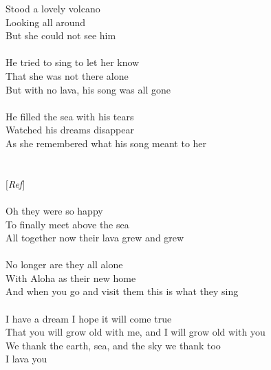 {Stood a lovely volcano\\
Looking all around\\
But she could not see him\\
\\
He tried to sing to let her know\\
That she was not there alone\\
But with no lava, his song was all gone\\
\\
He filled the sea with his tears\\
Watched his dreams disappear\\
As she remembered what his song meant to her\\
\\
\\
\emph{\ensuremath{[}Ref\ensuremath{]}}\\
\\
Oh they were so happy\\
To finally meet above the sea\\
All together now their lava grew and grew\\
\\
No longer are they all alone\\
With Aloha as their new home\\
And when you go and visit them this is what they sing\\
\\
I have a dream I hope it will come true\\
That you will grow old with me, and I will grow old with you\\
We thank the earth, sea, and the sky we thank too\\
I lava you
}


